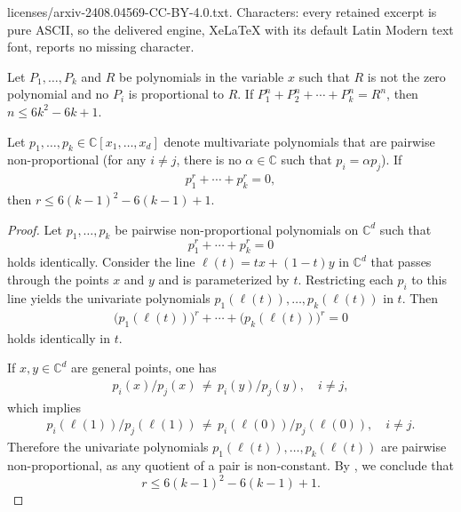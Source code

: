 \documentclass[10pt,a4paper]{amsart}
\newcommand{\kNS}{k}
\newcommand{\nNS}{n}
\newcommand{\upperboundn}[1]{6{#1}^2-6#1+1}
\begin{document}
licenses/arxiv-2408.04569-CC-BY-4.0.txt. Characters: every retained excerpt is pure ASCII, so the delivered engine, XeLaTeX with its default Latin Modern text font, reports no missing character.
\begin{corollary}\label{cor:NS-polynomials}
Let $P_1,\dots,P_\kNS$ and $R$ be polynomials in the variable $x$ such that $R$ is not the zero polynomial and no $P_i$ is proportional to $R$.  
If $P_1^\nNS + P_2^\nNS + \cdots + P_\kNS^\nNS = R^\nNS$, then 
$n\le \upperboundn{\kNS}$.

\end{corollary}

\begin{lemma}\label{lemma:ns-generalization}
Let $p_1,\dotsc,p_k\in\mathbb{C}[x_1,\dotsc,x_d]$ denote multivariate polynomials that are pairwise non-proportional (for any $i\not=j$, there is no $\alpha\in \mathbb{C}$ such that $p_i=\alpha p_j$). 
If
\begin{align*}
p_1^r + \dotsb + p_k^r = 0,
\end{align*}
then 
$r\le \upperboundn{(\kNS-1)}$.
\end{lemma}

\begin{proof}
Let $p_1,\dots, p_k$ be pairwise non-proportional polynomials on $\mathbb{C}^d$ such that
\[
p_1^r+\cdots+p_k^r =0
\]
holds identically.  
Consider the line $\ell(t)=tx+(1-t)y$ in $\mathbb{C}^d$ that  passes through the points $x$ and $y$ and is parameterized by $t$. 
Restricting each $p_i$ to this line yields the univariate polynomials 
$p_1(\ell(t)),\dots,p_k(\ell(t))$ in $t$.
Then
    \begin{align*}
        \big(p_1(\ell(t))\big)^r + \dotsb + \big(p_k(\ell(t))\big)^r = 0
    \end{align*}
holds identically in $t$. 

If  $x,y\in\mathbb{C}^d$ are general points,
one has
    \begin{align*}
    p_i(x)/p_j(x)
    \,\ne\, p_i(y)/p_j(y),\quad {i\neq j},
    \end{align*}
which implies 
    \begin{align*}
    p_i(\ell(1))/p_j(\ell(1))
    \,\ne\,
    p_i(\ell(0))/p_j(\ell(0)),\quad i\neq j.
    \end{align*}   
Therefore the univariate polynomials 
 $p_1(\ell(t)),\dots,p_k(\ell(t))$ are pairwise non-proportional, as any quotient of a pair is non-constant.
  By ,
    we conclude that 
\[r\le \upperboundn{(\kNS-1)}.\]
\end{proof}
\end{document}
